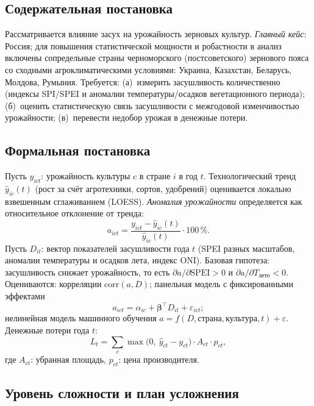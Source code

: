 \documentclass[14pt,a4paper]{extarticle}
\begin{document}
\subsection{Содержательная постановка}

Рассматривается влияние засух на урожайность зерновых культур. \emph{Главный кейс}: Россия; для повышения статистической мощности и робастности в анализ включены сопредельные страны черноморского (постсоветского) зернового пояса со сходными агроклиматическими условиями: Украина, Казахстан, Беларусь, Молдова, Румыния. Требуется: (а)~измерить засушливость количественно (индексы SPI/SPEI и аномалии температуры/осадков вегетационного периода); (б)~оценить статистическую связь засушливости с межгодовой изменчивостью урожайности; (в)~перевести недобор урожая в денежные потери.

\subsection{Формальная постановка}

Пусть $y_{ict}$: урожайность культуры $c$ в стране $i$ в год $t$. Технологический тренд $\hat{y}_{ic}(t)$ (рост за счёт агротехники, сортов, удобрений) оценивается локально взвешенным сглаживанием (LOESS). \emph{Аномалия урожайности} определяется как относительное отклонение от тренда:
\begin{equation}
a_{ict} = \frac{y_{ict} - \hat{y}_{ic}(t)}{\hat{y}_{ic}(t)}\cdot 100\,\%.
\end{equation}
Пусть $D_{it}$: вектор показателей засушливости года $t$ (SPEI разных масштабов, аномалии температуры и осадков лета, индекс ONI). Базовая гипотеза: засушливость снижает урожайность, то есть $\partial a / \partial \text{SPEI} > 0$ и $\partial a / \partial T_{\text{лето}} < 0$. Оцениваются: корреляции $\mathrm{corr}(a, D)$; панельная модель с фиксированными эффектами
\begin{equation}
a_{ict} = \alpha_{ic} + \boldsymbol{\beta}^{\top} D_{it} + \varepsilon_{ict};
\end{equation}
нелинейная модель машинного обучения $a = f(D, \text{страна}, \text{культура}, t) + \varepsilon$. Денежные потери года $t$:
\begin{equation}
L_{t} = \sum_{c} \max\!\big(0,\ \hat{y}_{ct}-y_{ct}\big)\cdot A_{ct}\cdot p_{ct},
\end{equation}
где $A_{ct}$: убранная площадь, $p_{ct}$: цена производителя.

\subsection{Уровень сложности и план усложнения}
\end{document}
